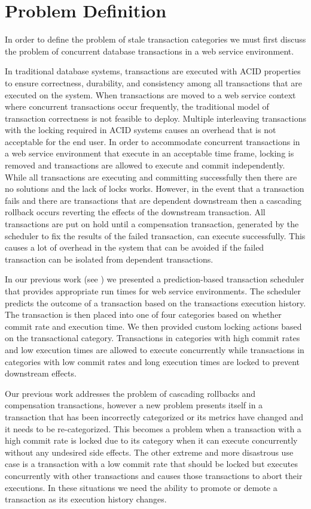 \section{Problem Definition}
\label{sec:problem_definition}

In order to define the problem of stale transaction categories we must first discuss the problem of concurrent database transactions in a web service environment.

In traditional database systems, transactions are executed with \ac{ACID} properties to ensure correctness, durability, and consistency among all transactions that are executed on the system. When transactions are moved to a web service context where concurrent transactions occur frequently, the traditional model of transaction correctness is not feasible to deploy. Multiple interleaving transactions with the locking required in \ac{ACID} systems causes an overhead that is not acceptable for the end user. In order to accommodate concurrent transactions in a web service environment that execute in an acceptable time frame, locking is removed and transactions are allowed to execute and commit independently. While all transactions are executing and committing successfully then there are no solutions and the lack of locks works. However, in the event that a transaction fails and there are transactions that are dependent downstream then a cascading rollback occurs reverting the effects of the downstream transaction. All transactions are put on hold until a compensation transaction, generated by the scheduler to fix the results of the failed transaction, can execute successfully. This causes a lot of overhead in the system that can be avoided if the failed transaction can be isolated from dependent transactions.

In our previous work (see \cite{ravan_ensuring_2020}) we presented a prediction-based transaction scheduler that provides appropriate run times for web service environments. The scheduler predicts the outcome of a transaction based on the transactions execution history. The transaction is then placed into one of four categories based on whether commit rate and execution time. We then provided custom locking actions based on the transactional category. Transactions in categories with high commit rates and low execution times are allowed to execute concurrently while transactions in categories with low commit rates and long execution times are locked to prevent downstream effects.

Our previous work addresses the problem of cascading rollbacks and compensation transactions, however a new problem presents itself in a transaction that has been incorrectly categorized or its metrics have changed and it needs to be re-categorized. This becomes a problem when a transaction with a high commit rate is locked due to its category when it can execute concurrently without any undesired side effects. The other extreme and more disastrous use case is a transaction with a low commit rate that should be locked but executes concurrently with other transactions and causes those transactions to abort their executions. In these situations we need the ability to promote or demote a transaction as its execution history changes. 

